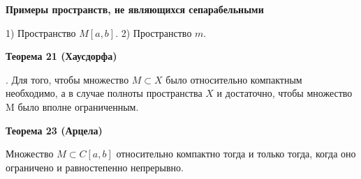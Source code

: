 {%

\textbf{Примеры пространств, не являющихся сепарабельными}


    1)     Пространство $M [a, b]$.
    2)	Пространство $m$.




\textbf{Теорема 21 (Хаусдорфа) }

\MS. Для того,
чтобы множество $M \subset X$ было относительно компактным необходимо,
а в случае
полноты пространства $X$ и достаточно, чтобы множество M
было вполне ограниченным.



\textbf{Теорема 23 (Арцела) }

Множество $M \subset C[a, b]$ относительно компактно
тогда и только тогда, когда оно ограничено и равностепенно непрерывно.
}
